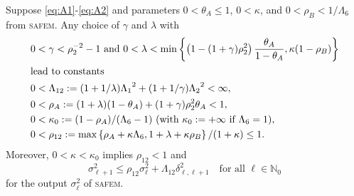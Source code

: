 \documentclass{siamltex1213}
\begin{document}
\begin{theorem}[(A12) reduction] \label{thm:contraction}
Suppose \eqref{eq:A1}-\eqref{eq:A2} and parameters $0<\theta_A\leq 1$, 
$0<\kappa $,  and $0<\rho_B<1/ {\ensuremath{\Lambda_{\mathrm{6}}}}$ 
from {\textsc{safem}\xspace}. Any choice of $\gamma$ and $\lambda$ with 
	\begin{align}
	&0<\gamma<\rho_2^{-2}-1 \text{ and }0<\lambda 
	<\min \left\{\left( 1-(1+\gamma)\rho_2^2\right)\frac{\theta_A}{1-\theta_A}, 
	\kappa (1-\rho_B)\right\} \label{eq:gamma}\\
		\intertext{lead to constants }
&0<{\ensuremath{\Lambda_{\mathrm{12}}}}:=(1+1/\lambda){\ensuremath{\Lambda_{\mathrm{1}}}}^2+(1+1/\gamma){\ensuremath{\Lambda_{\mathrm{2}}}}^2<\infty \label{eq:LII},\\
&0<\rho_A:=(1+\lambda)(1-\theta_A) +(1+\gamma)\rho_{2}^2\theta_A<1, \label{eq:rhoA}\\
&0<\kappa_0:=(1-\rho_A)/({\ensuremath{\Lambda_{\mathrm{6}}}}-1) \text{ (with $\kappa_0:=+\infty$ if ${\ensuremath{\Lambda_{\mathrm{6}}}}=1$)},\\
&0<\rho_{12}:=\max \left\lbrace \rho_{A} + \kappa{\ensuremath{\Lambda_{\mathrm{6}}}}, 1+\lambda +\kappa
 \rho_B\right\rbrace/(1+\kappa)\le 1 .\label{eq:rho}
	\end{align}
Moreover, $0<\kappa  <\kappa_0$ implies $\rho_{12}<1$ and
	\begin{equation}
		\sigma_{\ell+1}^2 \leq \rho_{12} \sigma_{\ell}^2  + {\ensuremath{\Lambda_{\mathrm{12}}}} \delta^2_{\ell, \ell+1} 
		\quad \text{for all } \ell\in{\mathbb{N}_0}
		\tag{A12} \label{eq:A12}
	\end{equation}
for 	the output $\sigma_\ell^2$ of {\textsc{safem}\xspace}.
\end{theorem}
\end{document}
